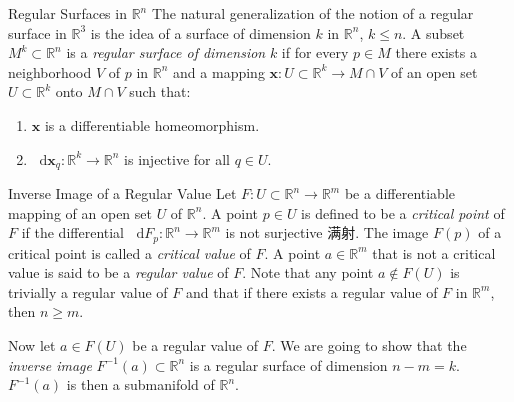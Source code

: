 \documentclass[
	border={25mm 20mm 25mm 30mm},  %
	varwidth,  %
]{standalone}
\newcommand\dd{\mathop{}\!\mathrm{d}}%
\begin{document}
\begin{tips}{Regular Surfaces in \(\mathbb{R}^n\)}
    The natural generalization of the notion of a regular surface in \(\mathbb{R}^3\) is the idea of a surface of dimension \(k\) in \(\mathbb{R}^n\), \(k\leqslant n\). A subset \(M^k\subset\mathbb{R}^n\) is a \textsl{regular surface of dimension} \(k\) if for every \(p\in M\) there exists a neighborhood \(V\) of \(p\) in \(\mathbb{R}^n\) and a mapping \(\mathbf{x}:U\subset\mathbb{R}^k\to M\cap V\) of an open set \(U\subset\mathbb{R}^k\) onto \(M\cap V\) such that:
    \begin{enumerate}[(1)]
        \item \(\mathbf{x}\) is a differentiable homeomorphism.
        \item \(\dd\mathbf{x}_q:\mathbb{R}^k\to\mathbb{R}^n\) is injective for all \(q\in U\).
    \end{enumerate}
\end{tips}

\begin{tips}{Inverse Image of a Regular Value}
    Let \(F:U\subset\mathbb{R}^n\to\mathbb{R}^m\) be a differentiable mapping of an open set \(U\) of \(\mathbb{R}^n\). A point \(p\in U\) is defined to be a \textsl{critical point} of \(F\) if the differential \(\dd F_p:\mathbb{R}^n\to\mathbb{R}^m\) is not surjective 满射. The image \(F(p)\) of a critical point is called a \textsl{critical value} of \(F\). A point \(a\in\mathbb{R}^m\) that is not a critical value is said to be a \textsl{regular value} of \(F\). Note that any point \(a\notin F(U)\) is trivially a regular value of \(F\) and that if there exists a regular value of \(F\) in \(\mathbb{R}^m\), then \(n\geqslant m\).

    Now let \(a\in F(U)\) be a regular value of \(F\). We are going to show that the \textsl{inverse image} \(F^{-1}(a)\subset\mathbb{R}^n\) is a regular surface of dimension \(n-m=k\). \(F^{-1}(a)\) is then a submanifold of \(\mathbb{R}^n\).
\end{tips}
\end{document}

